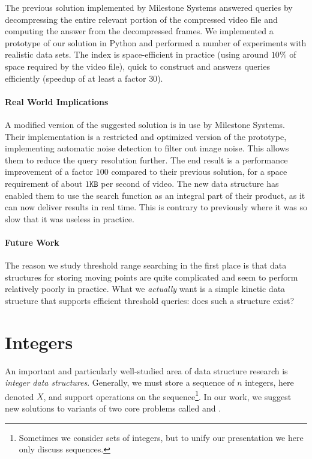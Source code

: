 The previous solution implemented by Milestone Systems answered queries by decompressing the entire relevant portion of the compressed video file and computing the answer from the decompressed frames. 
We implemented a prototype of our solution in Python and performed a number of experiments with realistic data sets. The index is space-efficient in practice (using around $10\%$ of space required by the video file), quick to construct and answers queries efficiently (speedup of at least a factor $30$). 

\paragraph{Real World Implications} 
A modified version of the suggested solution is in use by Milestone Systems. Their implementation is a restricted and optimized version of the prototype, implementing automatic noise detection to filter out image noise. This allows them to reduce the query resolution further. The end result is a performance improvement of a factor $100$ compared to their previous solution, for a space requirement of about $1\texttt{KB}$ per second of video. The new data structure has enabled them to use the search function as an integral part of their product, as it can now deliver results in real time. This is contrary to previously where it was so slow that it was useless in practice.


\paragraph{Future Work}
The reason we study threshold range searching in the first place is that data structures for storing moving points are quite complicated and seem to perform relatively poorly in practice.
What we \emph{actually} want is a simple kinetic data structure that supports efficient threshold queries: does such a structure exist?


\section{Integers}
An important and particularly well-studied area of data structure research is \emph{integer data structures}. Generally, we must store a sequence of $n$ integers, here denoted $X$, and support operations on the sequence\footnote{Sometimes we consider sets of integers, but to unify our presentation we here only discuss sequences.}. In our work, we suggest new solutions to variants of two core problems called  and .


